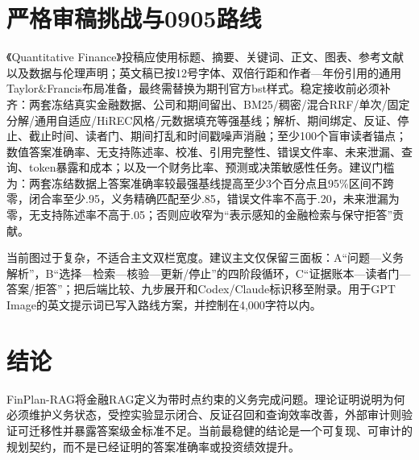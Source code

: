 \documentclass[12pt,openright]{ctexbook}
\begin{document}
\chapter{严格审稿挑战与0905路线}
《Quantitative Finance》投稿应使用标题、摘要、关键词、正文、图表、参考文献以及数据与伦理声明；英文稿已按12号字体、双倍行距和作者—年份引用的通用Taylor\&Francis布局准备，最终需替换为期刊官方bst样式。稳定接收前必须补齐：两套冻结真实金融数据、公司和期间留出、BM25/稠密/混合RRF/单次/固定分解/通用自适应/HiREC风格/元数据填充等强基线；解析、期间绑定、反证、停止、截止时间、读者门、期间打乱和时间戳噪声消融；至少100个盲审读者锚点；数值答案准确率、无支持陈述率、校准、引用完整性、错误文件率、未来泄漏、查询、token暴露和成本；以及一个财务比率、预测或决策敏感性任务。建议门槛为：两套冻结数据上答案准确率较最强基线提高至少3个百分点且95\%区间不跨零，闭合率至少.95，义务精确匹配至少.85，错误文件率不高于.20，未来泄漏为零，无支持陈述率不高于.05；否则应收窄为“表示感知的金融检索与保守拒答”贡献。

当前图过于复杂，不适合主文双栏宽度。建议主文仅保留三面板：A“问题—义务解析”，B“选择—检索—核验—更新/停止”的四阶段循环，C“证据账本—读者门—答案/拒答”；把后端比较、九步展开和Codex/Claude标识移至附录。用于GPT Image的英文提示词已写入路线方案，并控制在4,000字符以内。

\chapter{结论}
FinPlan-RAG将金融RAG定义为带时点约束的义务完成问题。理论证明说明为何必须维护义务状态，受控实验显示闭合、反证召回和查询效率改善，外部审计则验证可迁移性并暴露答案级金标准不足。当前最稳健的结论是一个可复现、可审计的规划契约，而不是已经证明的答案准确率或投资绩效提升。

\backmatter
\nocite{simplemem,actmem,oblivion,memoryworth,trivium,govmem,zou2026demem,tan2025rmm,yuan2026retrieval,zhou2025mem1,kim2025premem,cai2025fracom,tan2025membench,hu2025memoryagentbench,murphy2003dynamic,manski2003partial,stoye2012minimax,hernan2020causal,imbens2015causal,auer2002bandit,li2006abstraction,abel2020abstraction,zhu2025fintmmb}


\end{document}
